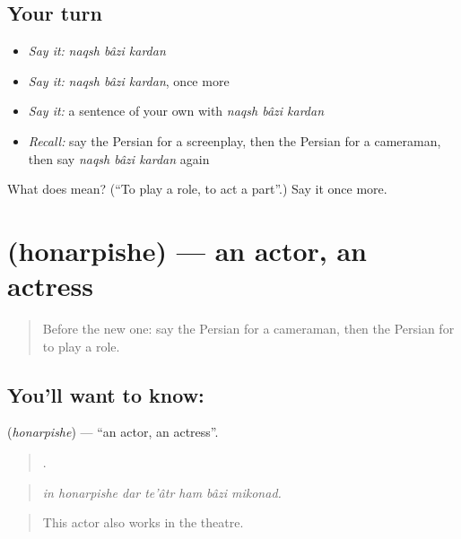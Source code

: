 \subsection*{Your turn}
\begin{itemize}
\raggedright
  \item \emph{Say it:} \emph{naqsh bâzi kardan}
  \item \emph{Say it:} \emph{naqsh bâzi kardan}, once more
  \item \emph{Say it:} a sentence of your own with \emph{naqsh bâzi kardan}
  \item \emph{Recall:} say the Persian for a screenplay, then the Persian for a cameraman, then say \emph{naqsh bâzi kardan} again
\end{itemize}

\begin{tcolorbox}[breakable,colback=teal!4,colframe=teal!35!black,title={Before you move on}]
What does    mean? (\textquotedblleft{}To play a role, to act a part\textquotedblright{}.) Say it once more.
\end{tcolorbox}
\section[\texorpdfstring{\fa{هنرپیشه} (honarpishe)}{هنرپیشه (honarpishe)}]{ (honarpishe) — an actor, an actress}

\label{lesson:FA-C524-honarpishe}



\begin{quote}
Before the new one: say the Persian for a cameraman, then the Persian for to play a role.
\end{quote}

\subsection*{You'll want to know: }
\textbf{} (\emph{honarpishe}) — \textquotedblleft{}an actor, an actress\textquotedblright{}.

\begin{quote}
      .
\end{quote}

\begin{quote}
\emph{in honarpishe dar te'âtr ham bâzi mikonad.}
\end{quote}

\begin{quote}
This actor also works in the theatre.
\end{quote}

